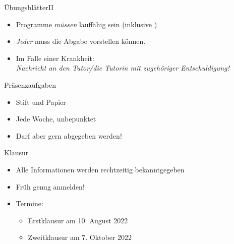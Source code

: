 \begin{frame}[t]{Übungsblätter\hfill II}
    \begin{itemize}[<+(1)->]
        \itemsep12pt
        \item Programme \emph{müssen} lauffähig sein (inklusive )\pause
        \item \emph{Jeder} muss die Abgabe vorstellen können.\pause{}
        \item Im Falle einer Krankheit:\pause\\\emph{Nachricht an den Tutor/die Tutorin mit zugehöriger Entschuldigung!}
    \end{itemize}
    \vfill
    \begin{center}
    \end{center}
\end{frame}

\iffull
\begin{frame}[t]{Präsenzaufgaben}
    \begin{itemize}[<+(1)->]
        \itemsep10pt
        \item Stift und Papier
        \item Jede Woche, unbepunktet
        \item Darf aber gern abgegeben werden!
    \end{itemize}
\end{frame}
\fi

\begin{frame}{Klausur}
    \begin{itemize}
        \itemsep16pt
        \item Alle Informationen werden rechtzeitig bekanntgegeben
        \item Früh genug anmelden!
        \item Termine: \begin{itemize}
            \item Erstklausur am 10. August 2022
            \item Zweitklausur am 7. Oktober 2022
        \end{itemize}
    \end{itemize}
\end{frame}

